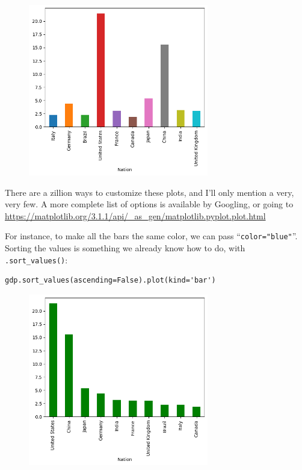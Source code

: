 \begin{figure}[ht]
\centering
\includegraphics[width=0.7\textwidth]{gdp.png}
\end{figure}

There are a zillion ways to customize these plots, and I'll only mention a
very, very few. A more complete list of options is available by Googling, or
going to \url{https://matplotlib.org/3.1.1/api/\_as\_gen/matplotlib.pyplot.plot.html}


For instance, to make all the bars the same color, we can pass
``\texttt{color="blue"}''. Sorting the values is something we already know how
to do, with \texttt{.sort\_values()}:

\begin{Verbatim}[fontsize=\small,samepage=true,frame=single,framesep=3mm]
gdp.sort_values(ascending=False).plot(kind='bar')
\end{Verbatim}

\begin{figure}[ht]
\centering
\includegraphics[width=0.7\textwidth]{gdp2.png}
\end{figure}

